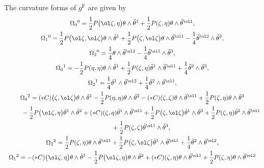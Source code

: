\begin{Proposition}
The curvature forms of $g^{\mathrm{F}}$ are given by
\begin{gather*}
\Omega_0{}^0=\frac{1}{2}P\bigl(\ol\zeta, \eta\bigr)\theta\wedge\tilde\theta^{1}+\frac{1}{2}P(\zeta, \eta)\theta\wedge\tilde\theta^{\ol1}, \\
\Omega_1{}^0=\frac{1}{2}P\bigl(\ol\zeta, \ol\zeta\bigr)\theta\wedge\tilde\theta^1
 +\frac{1}{2}P\bigl(\zeta, \ol\zeta\bigr)\theta\wedge\tilde\theta^{\ol1}-\frac{1}{4}\tilde\theta^{\ol2}\wedge\tilde\theta^3, \\
 \Omega_2{}^0=\frac{1}{4}\theta\wedge\tilde\theta^{\ol2}-\frac{1}{4}\tilde\theta^{\ol1}\wedge\tilde\theta^3, \\
\Omega_0{}^1=-\frac{1}{2}P(\eta, \eta)\theta\wedge\tilde\theta^1+\frac{1}{2}P(\zeta, \eta)\tilde\theta^1\wedge\tilde\theta^{\ol1}+\frac{1}{4}\tilde\theta^2\wedge\tilde\theta^3, \\
\Omega_2{}^1=\frac{1}{4}\tilde\theta^1\wedge\tilde\theta^{\ol2}+\frac{1}{4}\tilde\theta^2\wedge\tilde\theta^{\ol1}, \\
\Omega_0{}^2=(*C)\bigl(\zeta, \ol\zeta\bigr)\theta\wedge\tilde\theta^1-\frac{1}{2}P(\eta, \eta)\theta\wedge\tilde\theta^2
 -(*C)(\zeta, \zeta)\theta\wedge\tilde\theta^{\ol1}+\frac{1}{2}P(\zeta, \eta)\theta\wedge\tilde\theta^3 \\
\hphantom{\Omega_0{}^2=}{}\hspace{0.2mm}
 -\frac{1}{2}P\bigl(\ol\zeta, \eta\bigr)\tilde\theta^1\wedge\tilde\theta^2
+(*C)(\zeta, \eta)\tilde\theta^1\wedge\tilde\theta^{\ol1}
+\frac{1}{2}P\bigl(\zeta, \ol\zeta\bigr) \tilde\theta^1\wedge\tilde\theta^3
+\frac{1}{2}P(\zeta, \eta)\tilde\theta^2\wedge\tilde\theta^{\ol1}
 \\
\hphantom{\Omega_0{}^2=}{}\hspace{0.2mm}
 +\frac{1}{2}P(\zeta, \zeta)\tilde\theta^{\ol1}\wedge\tilde\theta^3, \\
\Omega_2{}^2=\frac{1}{2}P(\zeta, \eta)\theta\wedge\tilde\theta^{\ol1}+\frac{1}{2}P\bigl(\zeta, \ol\zeta\bigr)\tilde\theta^1\wedge\tilde\theta^{\ol1}+\frac{1}{4}\tilde\theta^2\wedge\tilde\theta^{\ol2}, \\
\Omega_1{}^2=-(*C)\bigl(\ol\zeta, \eta\bigr)\theta\wedge\tilde\theta^1 -\frac{1}{2}P\bigl(\ol\zeta, \eta\bigr)\theta\wedge\tilde\theta^2
+(*C)(\zeta, \eta)\theta\wedge\tilde\theta^{\ol1}
+\frac{1}{2}P(\zeta, \eta)\theta\wedge\tilde\theta^{\ol2}
 \\
\hphantom{\Omega_1{}^2=}{}\hspace{0.2mm}

\end{gather*}
\end{Proposition}
